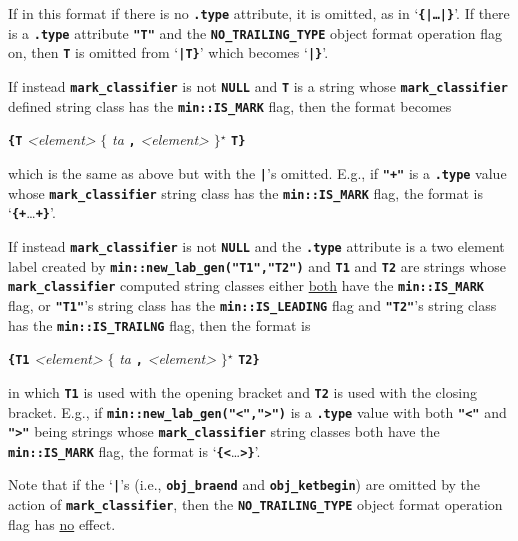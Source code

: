 \documentclass[12pt]{article}
\newcommand{\TT}[1]{{\tt \bfseries #1}}
\newcommand{\STAR}{{\Large $^\star$}}
\newcommand{\OPEN}{{$\{$}}
\newcommand{\CLOSE}{{$\}$}}
\newcommand{\EOL}{\penalty \exhyphenpenalty}
\begin{document}
If in this format if there is no \TT{.type} attribute, it is omitted, as in
`\TT{\{|\ldots|\}}'.  If there is a \TT{.type} attribute \TT{"T"} and
the \TT{NO\_\EOL TRAILING\_\EOL TYPE}
object format operation flag on, then \TT{T} is omitted from `\TT{|T\}}' which
becomes `\TT{|\}}'.

If instead \TT{mark\_\EOL classifier}\label{MARK_CLASSIFIER_USAGE} is not
\TT{NULL} and \TT{T} is a string
whose \TT{mark\_\EOL classifier} defined
string class has the \TT{min::\EOL IS\_\EOL MARK} flag, then the format becomes
\begin{center}
\TT{\{}\TT{T} {\em <element>}
    \OPEN{} {\em ta} \TT{,} \TT{\textvisiblespace} {\em <element>} \CLOSE\STAR{}
    \TT{T}\TT{\}}
\end{center}
which is the same as above but with the \TT{|}'s omitted.
E.g., if \TT{"+"} is a \TT{.type} value whose \TT{mark\_\EOL classifier} string
class has the \TT{min::\EOL IS\_\EOL MARK} flag,
the format is `\TT{\{+}\ldots\TT{+\}}'.

If instead \TT{mark\_\EOL classifier} is not
\TT{NULL} and the \TT{.type} attribute is a two element label created by
\TT{min::new\_\EOL lab\_\EOL gen("T1","T2")} and
\TT{T1} and \TT{T2} are strings whose \TT{mark\_\EOL classifier} computed
string classes either
\underline{both} have the \TT{min::\EOL IS\_\EOL MARK} flag, or
\TT{"T1"}'s string class has the \TT{min::\EOL IS\_\EOL LEADING} flag and
\TT{"T2"}'s string class has the \TT{min::\EOL IS\_\EOL TRAILNG} flag,
then the format is
\begin{center}
\TT{\{}\TT{T1} {\em <element>}
    \OPEN{} {\em ta} \TT{,} \TT{\textvisiblespace} {\em <element>} \CLOSE\STAR{}
    \TT{T2}\TT{\}}
\end{center}
in which \TT{T1} is used with the opening bracket and \TT{T2} is used
with the closing bracket.
E.g., if \TT{min::\EOL new\_\EOL lab\_\EOL gen("<",">")} is a \TT{.type}
value with both \TT{"<"} and \TT{">"} being strings whose
\TT{mark\_\EOL classifier} string classes both have the
\TT{min::\EOL IS\_\EOL MARK} flag, the format is `\TT{\{<}\ldots\TT{>\}}'.

Note that if the `\TT{|}'s (i.e., \TT{obj\_\EOL braend} and
\TT{obj\_\EOL ketbegin}) are omitted by the action of
\TT{mark\_\EOL classifier}, then the \TT{NO\_\EOL TRAILING\_\EOL TYPE}
object format operation flag has \underline{no} effect.
\end{document}
